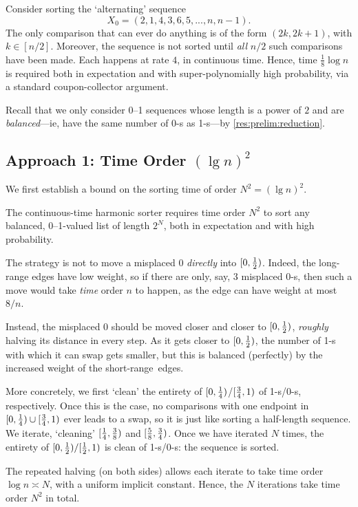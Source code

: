 \documentclass{article}
\begin{document}
\begin{Proof}
Consider sorting the `alternating' sequence
\[
	X_0
=
	(2, 1, 4, 3, 6, 5, ..., n, n-1).
\]
The only comparison that can ever do anything is of the form $(2k, 2k+1)$, with $k \in [n/2]$.
Moreover, the sequence is not sorted until \emph{all} $n/2$ such comparisons have been made.
Each happens at rate $4$, in continuous time.
Hence, time $\tfrac18 \log n$ is required both in expectation and with super-polynomially high probability, via a standard coupon-collector argument.
\end{Proof}

Recall that we only consider 0--1 sequences whose length is a power of $2$ and are \textit{balanced}---ie, have the same number of 0-s as 1-s---by \cref{res:prelim:reduction}.

\subsection{Approach 1: Time Order $(\lg n)^2$}
\label{sec:harm:1}

We first establish a bound on the sorting time of order $N^2 = (\lg n)^2$.

\begin{thm}
\label{res:harm:1:main}
The continuous-time harmonic sorter
requires time order $N^2$ to sort any balanced, 0--1-valued list of length $2^N$,
both in expectation and with high probability.
\end{thm}

\begin{Proof}[Strategy]
\qedtriangle
The strategy is not to move a misplaced 0 \emph{directly} into $[0, \tfrac12)$.
Indeed, the long-range edges have low weight, so if there are only, say, 3 misplaced 0-s, then such a move would take \emph{time} order $n$ to happen, as the edge can have weight at most $8/n$.

Instead, the misplaced 0 should be moved closer and closer to $[0, \tfrac12)$, \emph{roughly} halving its distance in every step.
As it gets closer to $[0, \tfrac12)$, the number of 1-s with which it can swap gets smaller, but this is balanced (perfectly) by the increased weight of the short-range~edges.

More concretely, we first `clean' the entirety of $[0, \tfrac14)$/$[\tfrac34, 1)$ of 1-s/0-s, respectively.
Once this is the case, no comparisons with one endpoint in $[0, \tfrac14) \cup [\tfrac34, 1)$ ever leads to a swap, so it is just like sorting a half-length sequence.
We iterate, `cleaning' $[\tfrac14, \tfrac38)$ and $[\tfrac58, \tfrac34)$.
Once we have iterated $N$ times, the entirety of $[0, \tfrac12)/[\tfrac12, 1)$ is clean of 1-s/0-s: the sequence is sorted.

The repeated halving (on both sides) allows each iterate to take time order $\log n \asymp N$, with a uniform implicit constant.
Hence, the $N$ iterations take time order $N^2$ in total.
\end{Proof}
\end{document}
